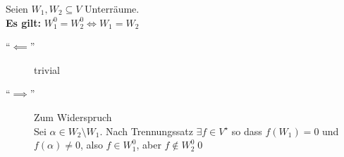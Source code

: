 \begin{subcorollary*}
	\label{zumtrennungssatz}
	 Seien $ W_1, W_2 \subseteq V $ Unterräume.\\
	 \textbf{Es gilt:} $ W_1^0 = W_2^0 \iff W_1 = W_2 $ 
\end{subcorollary*}

\begin{subproof*}
	\begin{description}
		\item[``$ \impliedby  $''] trivial
		\item[``$ \implies  $''] Zum Widerspruch\\
			Sei $ \alpha \in W_2 \setminus W_1 $. Nach Trennungssatz $ \exists f \in V^\star $ so dass $ f(W_1) = 0 $ und $ f(\alpha) \neq 0 $, also $ f \in W_1^0 $, aber $ f \not\in W_2^0 $\qed
	\end{description}
\end{subproof*}

